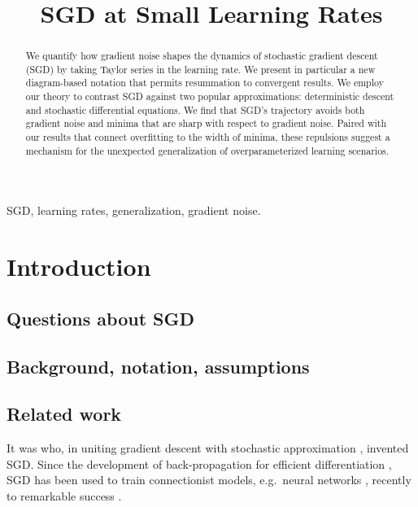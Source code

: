 \documentclass[final,12pt]{colt2021} %
\title[SGD at Small Learning Rates]{SGD at Small Learning Rates}
\begin{document}
    \maketitle
    
    \begin{abstract}%
        We quantify how gradient noise shapes the dynamics of stochastic
        gradient descent (SGD) by taking Taylor series in the learning rate.
        We present in particular a new diagram-based notation that permits
        resummation to convergent results.
        We employ our theory to contrast SGD against two popular
        approximations: deterministic descent and stochastic differential
        equations.  We find that SGD's trajectory avoids both gradient noise
        and minima that are sharp with respect to gradient noise.  Paired with
        our results that connect overfitting to the width of minima, these
        repulsions suggest a mechanism for the unexpected generalization of
        overparameterized learning scenarios.
    \end{abstract}
    
    \begin{keywords}%
        SGD, learning rates, generalization, gradient noise. 
    \end{keywords}
    \section{Introduction}
        \subsection{Questions about SGD}
    
        \subsection{Background, notation, assumptions}
   
        \subsection{Related work}
    

            It was \cite{ki52} who, in uniting gradient descent \citep{ca47}
            with stochastic approximation \citep{ro51}, invented SGD.  Since
            the development of back-propagation for efficient differentiation
            \citep{we74}, SGD has been used to train connectionist models,
            e.g.\ neural networks \citep{bo91}, recently to remarkable success
            \citep{le15}.
        
\end{document}
